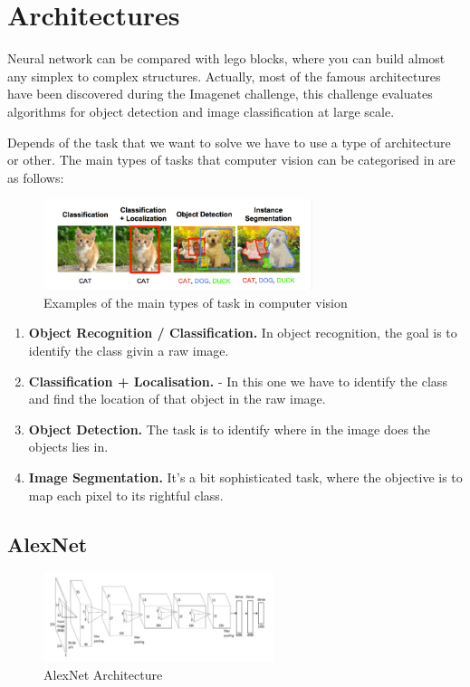 \section[Architectures]{Architectures}

Neural network can be compared with lego blocks, where you can build almost any simplex to complex structures. Actually, most of the famous architectures have been discovered during the Imagenet challenge, this challenge evaluates algorithms for object detection and image classification at large scale\cite{architectures}.

Depends of the task that we want to solve we have to use a type of architecture or other. The main types of tasks that computer vision can be categorised in are as follows:


\begin{figure}[H]
\centering
\includegraphics[width=0.7\textwidth]{./figures/Tasks-Architectures}
\caption{Examples of the main types of task in computer vision \cite{architectures}}
\end{figure}

\begin{enumerate}
\item \textbf{Object Recognition / Classification.} In object recognition, the goal is to identify the class givin a raw image.
\item \textbf{Classification + Localisation.} - In this one we have to identify the class and find the location of that object in the raw image.
\item \textbf{Object Detection.} The task is to identify where in the image does the objects lies in. 
\item \textbf{Image Segmentation.} It's a bit sophisticated task, where the objective is to map each pixel to its rightful class.
\end{enumerate}

\subsection[AlexNet]{AlexNet}

\begin{figure}[H]
\centering
\includegraphics[width=0.6\textwidth]{./figures/Alexnet}
\caption{AlexNet Architecture}
\end{figure}

